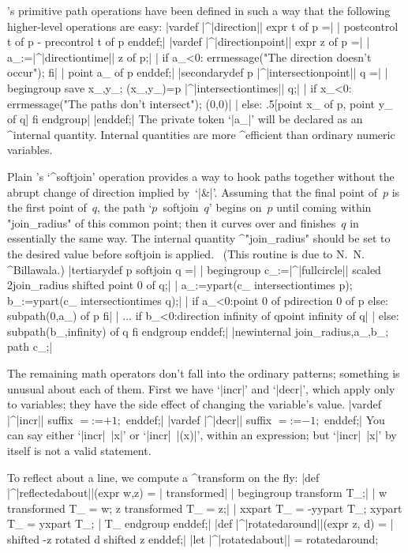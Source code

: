 \MF's primitive path operations have been defined in such a way that the
following higher-level operations are easy:
\beginlines
|vardef |^|direction|| expr t of p =|
| postcontrol t of p - precontrol t of p enddef;|
\smallskip
|vardef |^|directionpoint|| expr z of p =|
| a_:=|^|directiontime|| z of p;|
| if a_<0: errmessage("The direction doesn't occur"); fi|
| point a_ of p enddef;|
\smallskip
|secondarydef p |^|intersectionpoint|| q =|
| begingroup save x_,y_; (x_,y_)=p |^|intersectiontimes|| q;|
| if x_<0: errmessage("The paths don't intersect"); (0,0)|
| else: .5[point x_ of p, point y_ of q] fi endgroup|
|enddef;|
\weakendlines
The private token `|a_|' will be declared as an ^{internal quantity}.
Internal quantities are more ^{efficient} than ordinary numeric variables.

Plain \MF's `^{softjoin}' operation provides a way to hook paths together
without the abrupt change of direction implied by~`|&|'. Assuming that
the final point of~$p$ is the first point of~$q$, the path `$p$~softjoin~$q$'
begins on~$p$ until coming within "join\_radius" of this common point;
then it curves over and finishes~$q$ in essentially the same way.
The internal quantity ^"join\_radius" should be set to the desired
value before softjoin is applied. \ (This routine is due to N.~N. ^{Billawala}.)
\beginlines
|tertiarydef p softjoin q =|
| begingroup c_:=|^|fullcircle|| scaled 2join_radius shifted point 0 of q;|
| a_:=ypart(c_ intersectiontimes p); b_:=ypart(c_ intersectiontimes q);|
| if a_<0:point 0 of p{direction 0 of p} else: subpath(0,a_) of p fi|
|  ... if b_<0:{direction infinity of q}point infinity of q|
|   else: subpath(b_,infinity) of q fi endgroup enddef;|
|newinternal join_radius,a_,b_; path c_;|
\endlines

The remaining math operators don't fall into the ordinary patterns; something
is unusual about each of them. First we have `|incr|' and `|decr|', which apply
only to variables; they have the side effect of changing the variable's value.
\beginlines
|vardef |^|incr|| suffix $ = $:=$+1; $ enddef;|
|vardef |^|decr|| suffix $ = $:=$-1; $ enddef;|
\weakendlines
You can say either `|incr|~|x|' or `|incr|~|(x)|', within
an expression; but `|incr|~|x|' by itself is not a valid statement.

To reflect about a line, we compute a ^{transform} on the fly:
\beginlines
|def |^|reflectedabout||(expr w,z) =    %
| transformed|
|  begingroup transform T_;|
|  w transformed T_ = w;  z transformed T_ = z;|
|  xxpart T_ = -yypart T_; xypart T_ = yxpart T_; %
|  T_ endgroup enddef;|
\smallskip
|def |^|rotatedaround||(expr z, d) =    %
| shifted -z rotated d shifted z enddef;|
|let |^|rotatedabout|| = rotatedaround;   %
\endlines

